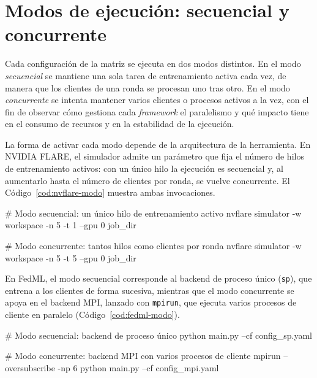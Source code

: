 \section{Modos de ejecución: secuencial y concurrente}\label{sec:modos-ejecucion}

Cada configuración de la matriz se ejecuta en dos modos distintos. En el modo \textit{secuencial}
se mantiene una sola tarea de entrenamiento activa cada vez, de manera que los clientes de una
ronda se procesan uno tras otro. En el modo \textit{concurrente} se intenta mantener varios
clientes o procesos activos a la vez, con el fin de observar cómo gestiona cada \textit{framework}
el paralelismo y qué impacto tiene en el consumo de recursos y en la estabilidad de la ejecución.

La forma de activar cada modo depende de la arquitectura de la herramienta. En NVIDIA FLARE, el
simulador admite un parámetro que fija el número de hilos de entrenamiento activos: con un único
hilo la ejecución es secuencial y, al aumentarlo hasta el número de clientes por ronda, se vuelve
concurrente. El Código~\ref{cod:nvflare-modo} muestra ambas invocaciones.

\begin{bashcodeNN}[title={Modos de ejecución en NVIDIA FLARE}, label={cod:nvflare-modo}, list entry={\protect\numberline{\thelisting}Modos de ejecución en NVIDIA FLARE}]
# Modo secuencial: un único hilo de entrenamiento activo
nvflare simulator -w workspace -n 5 -t 1 --gpu 0 job_dir

# Modo concurrente: tantos hilos como clientes por ronda
nvflare simulator -w workspace -n 5 -t 5 --gpu 0 job_dir
\end{bashcodeNN}

En FedML, el modo secuencial corresponde al backend de proceso único (\texttt{sp}), que entrena a
los clientes de forma sucesiva, mientras que el modo concurrente se apoya en el backend MPI,
lanzado con \texttt{mpirun}, que ejecuta varios procesos de cliente en paralelo
(Código~\ref{cod:fedml-modo}).

\begin{bashcodeNN}[title={Modos de ejecución en FedML}, label={cod:fedml-modo}, list entry={\protect\numberline{\thelisting}Modos de ejecución en FedML}]
# Modo secuencial: backend de proceso único
python main.py --cf config_sp.yaml

# Modo concurrente: backend MPI con varios procesos de cliente
mpirun --oversubscribe -np 6 python main.py --cf config_mpi.yaml
\end{bashcodeNN}

